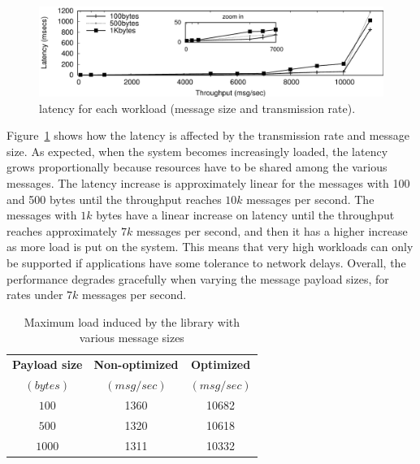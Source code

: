 \begin{figure}[h]
\centering
\includegraphics[width=\columnwidth]{images/gnuplot/sieveq/new_plot_latencyvsthroughput/latencyVSthroughput.pdf}
\caption{\sieveq latency for each workload (message size and transmission rate).}
\label{fig:lat_vs_throu}
\end{figure}

Figure~\ref{fig:lat_vs_throu} shows how the latency is affected by the transmission rate and message size.
As expected, when the system becomes increasingly loaded, the latency grows proportionally because resources have to be shared among the various messages.
The latency increase is approximately linear for the messages with 100 and 500 bytes until the throughput reaches $10k$ messages per second.
The messages with $1k$ bytes have a linear increase on latency until the throughput reaches approximately $7k$ messages per second, and then it has a higher increase as more load is put on the system.
This means that very high workloads can only be supported if applications have some tolerance to network delays.
Overall, the performance degrades gracefully when varying the message payload sizes, for rates under $7k$ messages per second.


\begin{table}[h]
\begin{center}
\begin{tabular}{c c c}\hline\hline
\textbf{Payload size } & \textbf{Non-optimized}  & \textbf{Optimized}   \\
\textbf{$(bytes)$} & \textbf{$(msg/sec)$} & \textbf{$(msg/sec)$}  \\\hline
$100  $ & 1360 & 10682 \\
$500  $ & 1320 & 10618 \\
$1000 $ & 1311 & 10332  \\
\hline\hline
\end{tabular}
\caption{Maximum load induced by the \sender library with various message sizes\label{tab:client_evaluation}}
\end{center}
\end{table}

